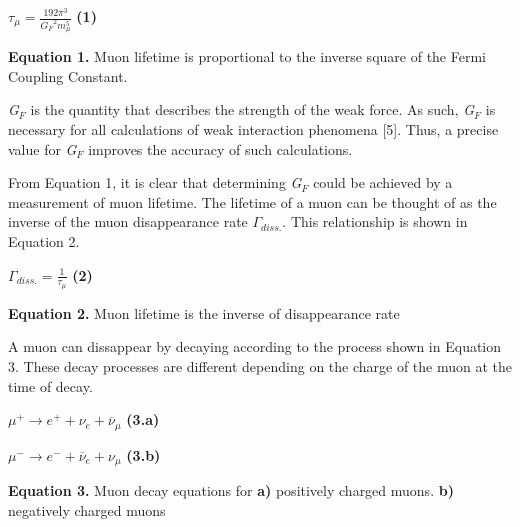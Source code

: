 \documentclass{article}
\begin{document}
\begin{center}
    
    $\tau_{\mu} = \frac{192 \pi^3}{\textit{G$_{F}$}^2 m_{\mu}^5}$ \hspace{10mm} \textbf{(1)}
    
    \vspace{5mm}
    
    \textbf{Equation 1.} Muon lifetime is proportional to the inverse square of the Fermi Coupling Constant.
    
\end{center}


\textit{G$_{F}$} is the quantity that describes the strength of the weak force. As such, \textit{G$_{F}$} is necessary for all calculations of weak interaction phenomena [5]. %
Thus, a precise value for \textit{G$_{F}$} improves the accuracy of such calculations.


From Equation 1, it is clear that determining \textit{G$_{F}$} could be achieved by a measurement of muon lifetime. The lifetime of a muon can be thought of as the inverse of the muon disappearance rate $\Gamma_{diss.}$. This relationship is shown in Equation 2. 

\begin{center}

    $\Gamma_{diss.} = \frac{1}{\tau_{\mu}}$ \hspace{10mm} \textbf{(2)}
    
    \vspace{5mm}
    
    \textbf{Equation 2.} Muon lifetime is the inverse of disappearance rate
    
\end{center}

A muon can dissappear by decaying according to the process shown in Equation 3. These decay processes are different depending on the charge of the muon at the time of decay. 

\begin{center}
    
    $\mu^{+} \rightarrow e^{+} + \nu_{e} + \overline{\nu}_{\mu}$ \hspace{10mm} \textbf{(3.a)}
    
    \vspace{1 mm}
    
    $\mu^{-} \rightarrow e^{-} + \overline{\nu}_{e} + \nu_{\mu}$ \hspace{10mm} \textbf{(3.b)}
    
    \vspace{5mm}
    
    \textbf{Equation 3.} Muon decay equations for \textbf{a)} positively charged muons. \textbf{b)} negatively charged muons 
    
\end{center}
  
\end{document}

